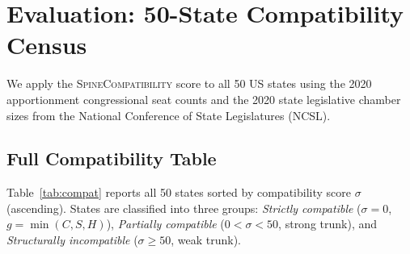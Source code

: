 \section{Evaluation: 50-State Compatibility Census}
\label{sec:evaluation}

We apply the \textsc{SpineCompatibility} score to all 50 US states using the
2020 apportionment congressional seat counts and the 2020 state legislative
chamber sizes from the National Conference of State Legislatures (NCSL).

\subsection{Full Compatibility Table}

Table~\ref{tab:compat} reports all 50 states sorted by compatibility score
$\sigma$ (ascending).  States are classified into three groups:
\emph{Strictly compatible} ($\sigma = 0$, $g = \min(C,S,H)$),
\emph{Partially compatible} ($0 < \sigma < 50$, strong trunk), and
\emph{Structurally incompatible} ($\sigma \geq 50$, weak trunk).

